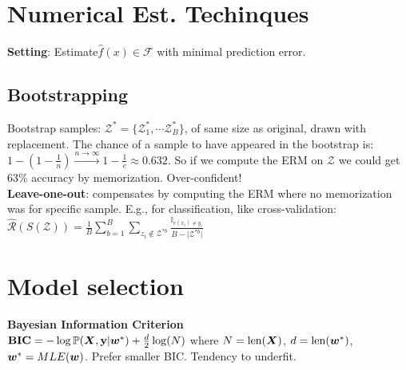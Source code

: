 \section*{Numerical Est. Techinques}
\textbf{Setting}: Estimate$\hat{f}(x) \in \mathcal{F}$ with minimal prediction error.

\subsection*{Bootstrapping}
Bootstrap samples: $\mathcal{Z}^*=\{\mathcal{Z}_1^*, \cdots\mathcal{Z}_B^*\}$, of same size as original, drawn with replacement.
The chance of a sample to have appeared in the bootstrap is:\\
$1-(1-\frac{1}{n})\stackrel{n\to\infty}{\to} 1-\frac{1}{e}\approx 0.632$. So if we compute the ERM on $\mathcal{Z}$ we could get 63\% accuracy by memorization. Over-confident!\\
\textbf{Leave-one-out}: compensates by computing the ERM where no memorization was for specific sample. E.g., for classification, like cross-validation:\\
$\hat{\mathcal{R}}(S(\mathcal{Z}))=\frac{1}{B}\sum_{b=1}^B\sum_{z_i\not\in\mathcal{Z}^{*b}}\frac{\mathbb{I}_{c(x_i)\neq y_i}}{B-\lvert\mathcal{Z}^{*b}\rvert}$

\section*{Model selection}
\textbf{Bayesian Information Criterion}\\
$\mathbf{BIC}=-\log\mathbb{P}({\bm{X}}, {\mathbf{y}}|{\bm{w}}^*)+\frac{d}{2}\log(N)$ where $N=\mathrm{len}({\bm{X}})$, $d=\mathrm{len}({\bm{w}}^*)$, ${\bm{w}}^*=MLE({\bm{w}})$. Prefer smaller BIC. Tendency to underfit.\\